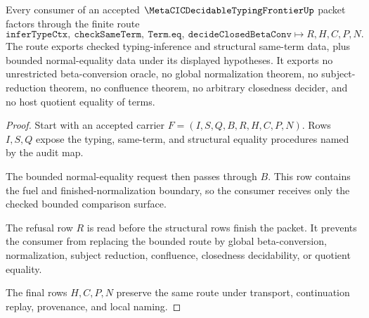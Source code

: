 \begin{theorem}
\label{thm:metacic-decidable-typing-frontier-nonescape}
Every consumer of an accepted $\MetaCICDecidableTypingFrontierUp$ packet factors through the finite route
$$
\texttt{inferTypeCtx},\ \texttt{checkSameTerm},\ \texttt{Term.eq},\ \texttt{decideClosedBetaConv}
\longmapsto R,H,C,P,N .
$$
The route exports checked typing-inference and structural same-term data, plus bounded normal-equality data under its displayed hypotheses. It exports no unrestricted beta-conversion oracle, no global normalization theorem, no subject-reduction theorem, no confluence theorem, no arbitrary closedness decider, and no host quotient equality of terms.
\end{theorem}
\begin{proof}
Start with an accepted carrier $F=(I,S,Q,B,R,H,C,P,N)$. Rows $I,S,Q$ expose the typing, same-term, and structural equality procedures named by the audit map.

The bounded normal-equality request then passes through $B$. This row contains the fuel and finished-normalization boundary, so the consumer receives only the checked bounded comparison surface.

The refusal row $R$ is read before the structural rows finish the packet. It prevents the consumer from replacing the bounded route by global beta-conversion, normalization, subject reduction, confluence, closedness decidability, or quotient equality.

The final rows $H,C,P,N$ preserve the same route under transport, continuation replay, provenance, and local naming.
\end{proof}

